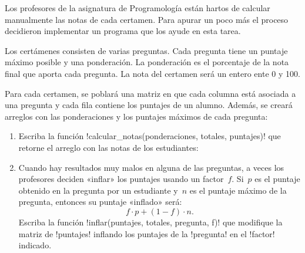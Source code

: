 Los profesores de la asignatura de Programología están hartos
de calcular manualmente las notas de cada certamen.
Para apurar un poco más el proceso
decidieron implementar un programa que los ayude en esta tarea.

Los certámenes consisten de varias preguntas.
Cada pregunta tiene un puntaje máximo posible y una ponderación.
La ponderación es el porcentaje de la nota final
que aporta cada pregunta.
La nota del certamen será un entero ente 0 y 100.

Para cada certamen,
se poblará una matriz en que cada columna está asociada a una pregunta
y cada fila contiene los puntajes de un alumno.
Además,
se creará arreglos con las ponderaciones y los puntajes máximos
de cada pregunta:



\begin{enumerate}[leftmargin=0pt,label=\emph{\alph*})]

  \item
    Escriba la función \li!calcular_notas(ponderaciones, totales, puntajes)!
    que retorne el arreglo con las notas de los estudiantes:
    

  \item
    Cuando hay resultados muy malos en alguna de las preguntas,
    a veces los profesores deciden «inflar» los puntajes
    usando un factor~\(f\).
    Si~\(p\) es el puntaje obtenido en la pregunta por un estudiante
    y~\(n\) es el puntaje máximo de la pregunta,
    entonces su puntaje «inflado» será:
    \[
        f\cdot p + (1 - f)\cdot n.
    \]
    Escriba la función \li!inflar(puntajes, totales, pregunta, f)!
    que modifique la matriz de \li!puntajes!
    inflando los puntajes de la \li!pregunta!
    en el \li!factor! indicado.
    

\end{enumerate}

